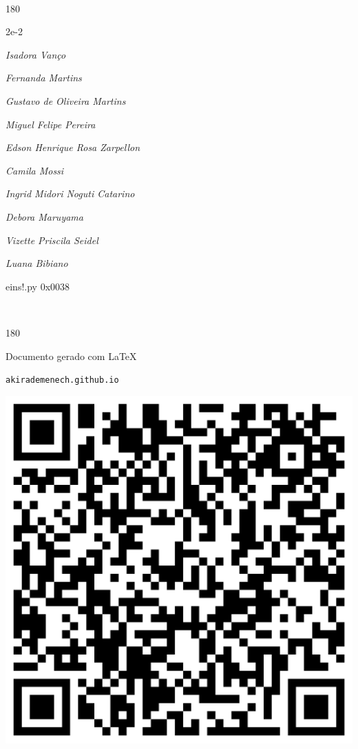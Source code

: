 \documentclass[12pt]{article}
\begin{document}
	\ 
	\vfill
	\begin{turn}{180}	
		\begin{minipage}{\textwidth}
		  	\ttfamily %
			\centering
			{\Huge 2e-2}
		  
			\hfill
		  
			

\textit{\small Isadora Vanço}

\textit{\small Fernanda Martins}

\textit{\small Gustavo de Oliveira Martins}

\textit{\small Miguel Felipe Pereira}

\textit{\small Edson Henrique Rosa Zarpellon}

\textit{\small Camila Mossi}

\textit{\small Ingrid Midori Noguti Catarino}

\textit{\small Debora Maruyama}

\textit{\small Vizette Priscila Seidel}

\textit{\small Luana Bibiano}

\bigskip

eins!.py
0x0038


		\end{minipage}	
	\end{turn}
	\vfill
	\

\pagebreak

	\begin{turn}{180}	
		\begin{minipage}{\textwidth}		  
		  Documento gerado com \LaTeX			
		  
		  \texttt{akirademenech.github.io}

		  \includegraphics[height=0.3\textheight]{2e-2.pdf}

		\end{minipage}	
	\end{turn}  
		  
\end{document}
